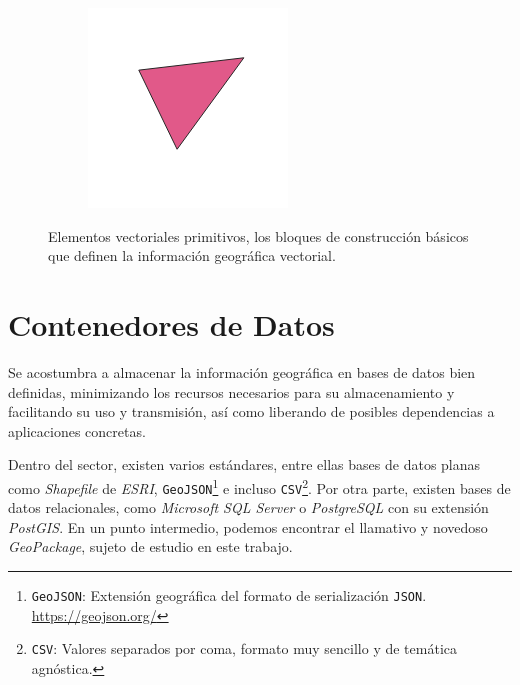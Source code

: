 \begin{figure}[htbp]
\begin{subfigure}{0.32\textwidth}
	\end{subfigure}
	\begin{subfigure}{0.32\textwidth}
		\centering
		\includegraphics[width=.95\textwidth]{img/models_vector_poly.png}
	\end{subfigure}
	\caption[Tipos básicos de los elementos vectoriales]{Elementos vectoriales primitivos, los bloques de construcción básicos que definen la información geográfica vectorial.}
\end{figure}

\section{Contenedores de Datos}
	Se acostumbra a almacenar la información geográfica en bases de datos \autocite[203-227]{volaya} bien definidas, minimizando los recursos necesarios para su almacenamiento y facilitando su uso y transmisión, así como liberando de posibles dependencias a aplicaciones concretas.

	Dentro del sector, existen varios estándares, entre ellas bases de datos planas como \textit{Shapefile} de \textit{ESRI}, \texttt{GeoJSON}\footnote{\texttt{GeoJSON}: Extensión geográfica del formato de serialización \texttt{JSON}. \url{https://geojson.org/}} e incluso \texttt{CSV}\footnote{\texttt{CSV}: Valores separados por coma, formato muy sencillo y de temática agnóstica.}. Por otra parte, existen bases de datos relacionales, como \textit{Microsoft SQL Server} o \textit{PostgreSQL} con su extensión \textit{PostGIS}. En un punto intermedio, podemos encontrar el llamativo y novedoso \textit{GeoPackage}, sujeto de estudio en este trabajo.

